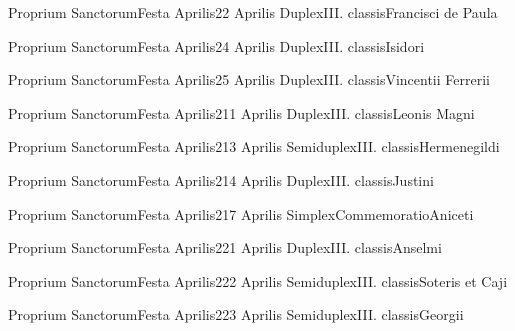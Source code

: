 \documentclass[invitatoriale-romanum.tex]{subfiles}
\begin{document}
	{Proprium Sanctorum}{Festa Aprilis}{2}{2 Aprilis}
	{Duplex}{III. classis}{Francisci de Paula}
	{}
	{}

	{Proprium Sanctorum}{Festa Aprilis}{2}{4 Aprilis}
	{Duplex}{III. classis}{Isidori}
	{}
	{}

	{Proprium Sanctorum}{Festa Aprilis}{2}{5 Aprilis}
	{Duplex}{III. classis}{Vincentii Ferrerii}
	{}
	{}

	{Proprium Sanctorum}{Festa Aprilis}{2}{11 Aprilis}
	{Duplex}{III. classis}{Leonis Magni}
	{}
	{}

	{Proprium Sanctorum}{Festa Aprilis}{2}{13 Aprilis}
	{Semiduplex}{III. classis}{Hermenegildi}
	{}
	{}

	{Proprium Sanctorum}{Festa Aprilis}{2}{14 Aprilis}
	{Duplex}{III. classis}{Justini}
	{}
	{}

	{Proprium Sanctorum}{Festa Aprilis}{2}{17 Aprilis}
	{Simplex}{Commemoratio}{Aniceti}
	{}
	{\invitferia}

	{Proprium Sanctorum}{Festa Aprilis}{2}{21 Aprilis}
	{Duplex}{III. classis}{Anselmi}
	{}
	{}

	{Proprium Sanctorum}{Festa Aprilis}{2}{22 Aprilis}
	{Semiduplex}{III. classis}{Soteris et Caji}
	{}
	{}

	{Proprium Sanctorum}{Festa Aprilis}{2}{23 Aprilis}
	{Semiduplex}{III. classis}{Georgii}
	{}
	{}
\end{document}
